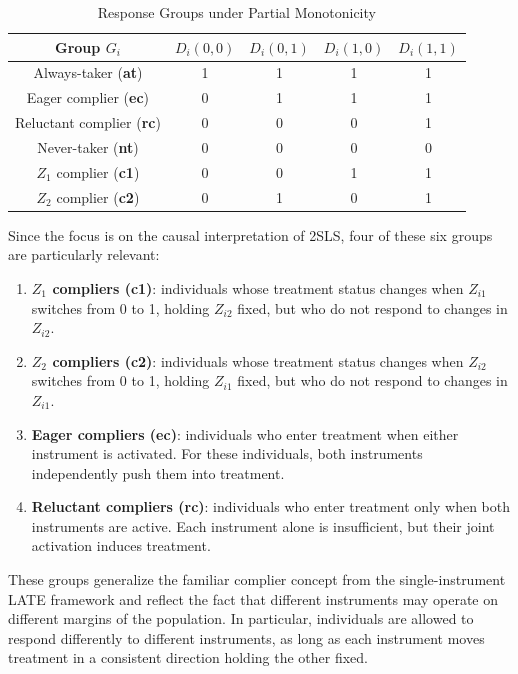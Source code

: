 \documentclass[
  12pt,
  a4paper,
  oneside]{article}
\begin{document}
\begin{table}[h!]
\centering
\begin{tabular}{c c c c c}
\hline
\textbf{Group} $G_i$ & $D_i(0,0)$ & $D_i(0,1)$
 & $D_i(1,0)$ & $D_i(1,1)$ \\
\hline
Always-taker (\textbf{at}) & 1 & 1 & 1 & 1 \\
Eager complier (\textbf{ec}) & 0 & 1 & 1 & 1 \\
Reluctant complier (\textbf{rc}) & 0 & 0 & 0 & 1 \\
Never-taker (\textbf{nt}) & 0 & 0 & 0 & 0 \\
$Z_1$ complier (\textbf{c1}) & 0 & 0 & 1 & 1 \\
$Z_2$ complier (\textbf{c2}) & 0 & 1 & 0 & 1 \\
\hline
\end{tabular}
\caption{Response Groups under Partial Monotonicity}
\end{table}

Since the focus is on the causal interpretation of 2SLS, four of these
six groups are particularly relevant:

\begin{enumerate}
\item \textbf{$Z_1$ compliers (c1)}: individuals whose treatment status changes when $Z_{i1}$ switches from 0 to 1, holding $Z_{i2}$ fixed, but who do not respond to changes in $Z_{i2}$.
\item \textbf{$Z_2$ compliers (c2)}: individuals whose treatment status changes when $Z_{i2}$ switches from 0 to 1, holding $Z_{i1}$ fixed, but who do not respond to changes in $Z_{i1}$.
\item \textbf{Eager compliers (ec)}: individuals who enter treatment when either instrument is activated. For these individuals, both instruments independently push them into treatment.
\item \textbf{Reluctant compliers (rc)}: individuals who enter treatment only when both instruments are active. Each instrument alone is insufficient, but their joint activation induces treatment.
\end{enumerate}

These groups generalize the familiar complier concept from the
single-instrument LATE framework and reflect the fact that different
instruments may operate on different margins of the population. In
particular, individuals are allowed to respond differently to different
instruments, as long as each instrument moves treatment in a consistent
direction holding the other fixed.
\end{document}
